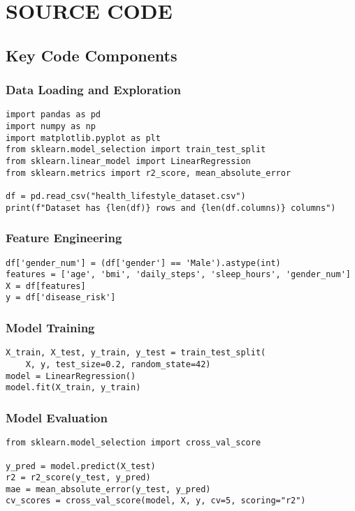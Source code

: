 \documentclass[12pt,a4paper]{article}
\begin{document}
\section{SOURCE CODE}

\subsection{Key Code Components}

\subsubsection{Data Loading and Exploration}
\begin{lstlisting}
import pandas as pd
import numpy as np
import matplotlib.pyplot as plt
from sklearn.model_selection import train_test_split
from sklearn.linear_model import LinearRegression
from sklearn.metrics import r2_score, mean_absolute_error

df = pd.read_csv("health_lifestyle_dataset.csv")
print(f"Dataset has {len(df)} rows and {len(df.columns)} columns")
\end{lstlisting}

\subsubsection{Feature Engineering}
\begin{lstlisting}
df['gender_num'] = (df['gender'] == 'Male').astype(int)
features = ['age', 'bmi', 'daily_steps', 'sleep_hours', 'gender_num']
X = df[features]
y = df['disease_risk']
\end{lstlisting}

\subsubsection{Model Training}
\begin{lstlisting}
X_train, X_test, y_train, y_test = train_test_split(
    X, y, test_size=0.2, random_state=42)
model = LinearRegression()
model.fit(X_train, y_train)
\end{lstlisting}

\subsubsection{Model Evaluation}
\begin{lstlisting}
from sklearn.model_selection import cross_val_score

y_pred = model.predict(X_test)
r2 = r2_score(y_test, y_pred)
mae = mean_absolute_error(y_test, y_pred)
cv_scores = cross_val_score(model, X, y, cv=5, scoring="r2")
\end{lstlisting}
\end{document}
